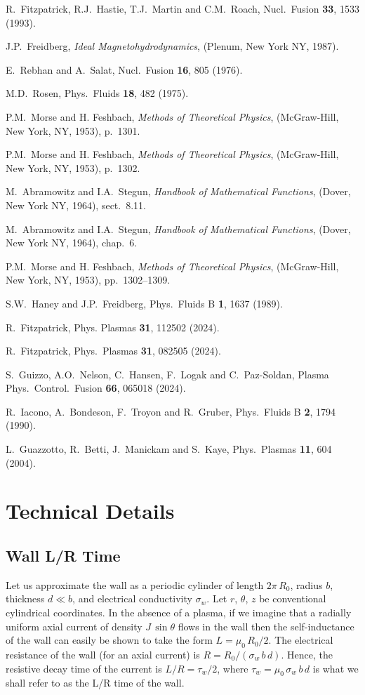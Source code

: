 \documentclass[12pt,prb,aps]{revtex4-1}
\begin{document}
\begin{thebibliography}{99}
 R.~Fitzpatrick, R.J.~Hastie, T.J.~Martin and C.M.~Roach, Nucl.\ Fusion {\bf 33}, 1533 (1993).

 J.P.~Freidberg, {\em Ideal Magnetohydrodynamics}, (Plenum, New York NY, 1987).

 E.~Rebhan and A.~Salat, Nucl.\ Fusion {\bf 16}, 805 (1976).

 M.D.~Rosen, Phys.\ Fluids {\bf 18}, 482 (1975). 

 P.M.~Morse and H. Feshbach, {\em Methods of Theoretical Physics}, (McGraw-Hill, New York, NY, 1953), p.~1301.

 P.M.~Morse and H. Feshbach, {\em Methods of Theoretical Physics}, (McGraw-Hill, New York, NY, 1953), p.~1302.

 M.~Abramowitz and I.A.~Stegun, {\em Handbook of Mathematical Functions}, (Dover, New York NY, 1964), sect.~8.11.

 M.~Abramowitz and I.A.~Stegun, {\em Handbook of Mathematical Functions}, (Dover, New York NY, 1964), chap.~6.

 P.M.~Morse and H. Feshbach, {\em Methods of Theoretical Physics}, (McGraw-Hill, New York, NY, 1953), pp.~1302--1309.

 S.W.~Haney and J.P.~Freidberg, Phys.\ Fluids B {\bf 1}, 1637 (1989).

 R.~Fitzpatrick, Phys. Plasmas {\bf 31}, 112502 (2024).

 R.~Fitzpatrick, Phys.\ Plasmas {\bf 31}, 082505 (2024).

 S.~Guizzo, A.O.~Nelson, C.~Hansen, F.~Logak and C.~Paz-Soldan, Plasma Phys.\ Control.\ Fusion {\bf 66},  065018  (2024).  

 R.~Iacono, A.~Bondeson, F.~Troyon and R.~Gruber, Phys.\ Fluids B {\bf 2}, 1794 (1990).

 L.~Guazzotto,  R.~Betti, J.~Manickam and  S.~Kaye, Phys.\ Plasmas {\bf 11}, 604 (2004).

\end{thebibliography}

\appendix
\section{Technical Details}
\subsection{Wall L/R Time}\label{loverr}
Let us approximate the wall as a periodic cylinder of length $2\pi\,R_0$, radius $b$, thickness $d\ll b$, and electrical conductivity $\sigma_w$. 
Let $r$, $\theta$, $z$ be conventional cylindrical coordinates. 
In the absence of a plasma, if we imagine that a radially uniform axial current of density $J\,\sin\theta$ flows in the wall then the self-inductance of the wall
can easily be shown to take the form $L=\mu_0\,R_0/2$. The electrical resistance of the wall (for an axial current) is $R=R_0/(\sigma_w\,b\,d)$. 
Hence, the resistive decay time of the current is $L/R= \tau_w/2$, where $\tau_w=\mu_0\,\sigma_w\,b\,d$ is what we shall refer to as the
L/R time of the wall. 
\end{document}
